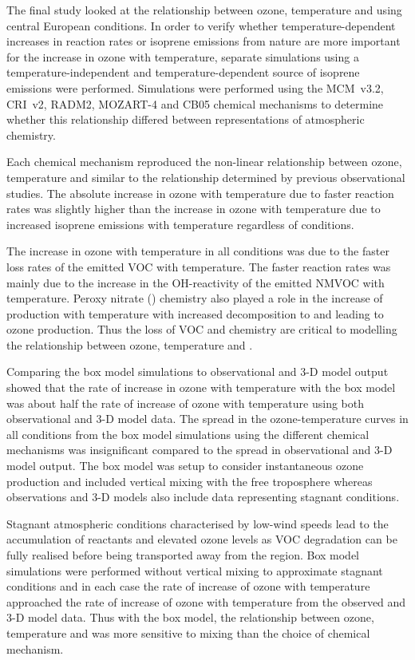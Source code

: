 The final study looked at the relationship between ozone, temperature and  using central European conditions.
In order to verify whether temperature-dependent increases in reaction rates or isoprene emissions from nature are more important for the increase in ozone with temperature, separate simulations using a temperature-independent and temperature-dependent source of isoprene emissions were performed.
Simulations were performed using the MCM~v3.2, CRI~v2, RADM2, MOZART-4 and CB05 chemical mechanisms to determine whether this relationship differed between representations of atmospheric chemistry.

Each chemical mechanism reproduced the non-linear relationship between ozone, temperature and  similar to the relationship determined by previous observational studies.
The absolute increase in ozone with temperature due to faster reaction rates was slightly higher than the increase in ozone with temperature due to increased isoprene emissions with temperature regardless of  conditions.

The increase in ozone with temperature in all  conditions was due to the faster loss rates of the emitted VOC with temperature.
The faster reaction rates was mainly due to the increase in the OH-reactivity of the emitted NMVOC with temperature.
Peroxy nitrate () chemistry also played a role in the increase of  production with temperature with increased decomposition to  and  leading to ozone production.
Thus the loss of VOC and  chemistry are critical to modelling the relationship between ozone, temperature and .

Comparing the box model simulations to observational and 3-D model output showed that the rate of increase in ozone with temperature with the box model was about half the rate of increase of ozone with temperature using both observational and 3-D model data.
The spread in the ozone-temperature curves in all  conditions from the box model simulations using the different chemical mechanisms was insignificant compared to the spread in observational and 3-D model output.
The box model was setup to consider instantaneous ozone production and included vertical mixing with the free troposphere whereas observations and 3-D models also include data representing stagnant conditions.

Stagnant atmospheric conditions characterised by low-wind speeds lead to the accumulation of reactants and elevated ozone levels as VOC degradation can be fully realised before being transported away from the region.
Box model simulations were performed without vertical mixing to approximate stagnant conditions and in each case the rate of increase of ozone with temperature approached the rate of increase of ozone with temperature from the observed and 3-D model data.
Thus with the box model, the relationship between ozone, temperature and  was more sensitive to mixing than the choice of chemical mechanism.

